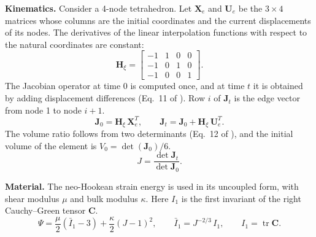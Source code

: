 \documentclass[11pt,a4paper]{article}
\newcommand{\Jm}{J^{-2/3}}
\newcommand{\mat}[1]{\mathbf{#1}}
\begin{document}
\textbf{Kinematics.} Consider a 4-node tetrahedron. Let $\mat{X}_e$ and $\mat{U}_e$ be the $3\times4$ matrices whose columns are the initial coordinates and the current displacements of its nodes. The derivatives of the linear interpolation functions with respect to the natural coordinates are constant:
\begin{equation}
\mat{H}_{\xi} = \begin{bmatrix} -1 & 1 & 0 & 0 \\ -1 & 0 & 1 & 0 \\ -1 & 0 & 0 & 1 \end{bmatrix}.
\end{equation}
The Jacobian operator at time $0$ is computed once, and at time $t$ it is obtained by adding displacement differences (Eq.~11 of \cite{zhang2021}). Row $i$ of $\mat{J}_t$ is the edge vector from node 1 to node $i+1$.
\begin{equation}
\mat{J}_0 = \mat{H}_{\xi}\,\mat{X}_e^{T}, \qquad \mat{J}_t = \mat{J}_0 + \mat{H}_{\xi}\,\mat{U}_e^{T}.
\end{equation}
The volume ratio follows from two determinants (Eq.~12 of \cite{zhang2021}), and the initial volume of the element is $V_0 = \det(\mat{J}_0)/6$.
\begin{equation}
J = \frac{\det \mat{J}_t}{\det \mat{J}_0}.
\end{equation}

\textbf{Material.} The neo-Hookean strain energy is used in its uncoupled form, with shear modulus $\mu$ and bulk modulus $\kappa$. Here $I_1$ is the first invariant of the right Cauchy--Green tensor $\mat{C}$.
\begin{equation}
\Psi = \frac{\mu}{2}\left(\bar{I}_1 - 3\right) + \frac{\kappa}{2}\left(J - 1\right)^2, \qquad \bar{I}_1 = \Jm\, I_1, \qquad I_1 = \operatorname{tr}\mat{C}.
\end{equation}
\end{document}

